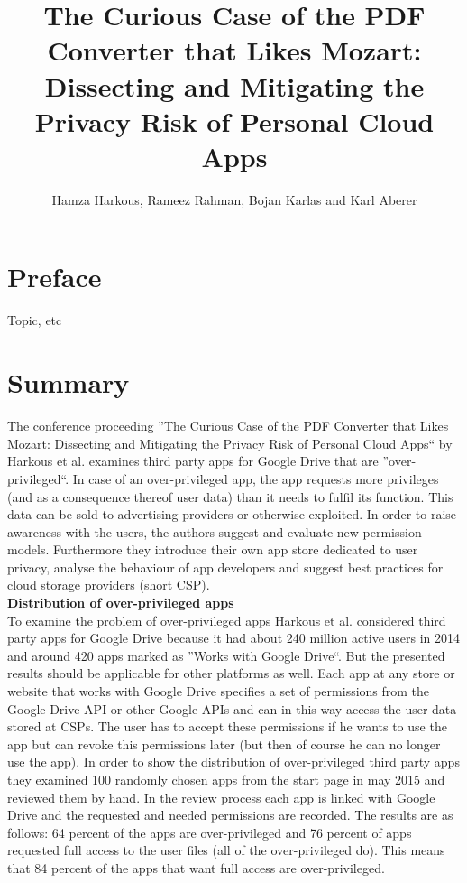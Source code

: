 \documentclass[11pt,twocolumn,a4paper,DIV=calc]{scrartcl}
\begin{document}
\title{The Curious Case of the PDF Converter that Likes Mozart: Dissecting and Mitigating the Privacy Risk of Personal Cloud Apps}
\author{Hamza Harkous, Rameez Rahman, Bojan Karlas and Karl Aberer}
\date{}
\maketitle
\section{Preface}
Topic, etc
\section{Summary}
The conference proceeding ''The Curious Case of the PDF Converter that Likes Mozart: Dissecting and Mitigating the Privacy Risk of Personal Cloud Apps`` by Harkous et al. examines third party apps for Google Drive that are ''over-privileged``. In case of an over-privileged app, the app requests more privileges (and as a consequence thereof user data) than it needs to fulfil its function. This data can be sold to advertising providers or otherwise exploited. In order to raise awareness with the users, the authors suggest and evaluate new permission models. Furthermore they introduce their own app store dedicated to user privacy, analyse the behaviour of app developers and suggest best practices for cloud storage providers (short CSP).  \\

\textbf{Distribution of over-privileged apps} \\
To examine the problem of over-privileged apps Harkous et al. considered third party apps for Google Drive because it had about 240 million active users in 2014 and around 420 apps marked as ''Works with Google Drive``. But the presented results should be applicable for other platforms as well. Each app at any store or website that works with Google Drive specifies a set of permissions from the Google Drive API or other Google APIs and can in this way access the user data stored at CSPs. The user has to accept these permissions if he wants to use the app but can revoke this permissions later (but then of course he can no longer use the app). In order to show the distribution of over-privileged third party apps they examined 100 randomly chosen apps from the start page in may 2015 and reviewed them by hand. In the review process each app is linked with Google Drive and the requested and needed permissions are recorded. The results are as follows: 64 percent of the apps are over-privileged and 76 percent of apps requested full access to the user files (all of the over-privileged do). This means that 84 percent of the apps that want full access are over-privileged. \\
\end{document}
